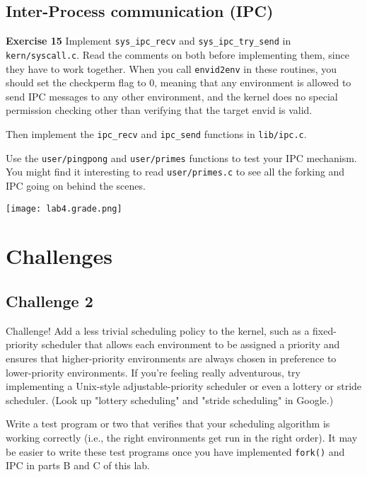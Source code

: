 \documentclass[11pt]{article}
\begin{document}
\subsection{Inter-Process communication (IPC)}

\begin{framed}
\noindent\textbf{Exercise 15} Implement \lstinline|sys_ipc_recv| and \lstinline|sys_ipc_try_send| in \lstinline|kern/syscall.c|. Read the comments on both before implementing them, since they have to work together. When you call \lstinline|envid2env| in these routines, you should set the checkperm flag to 0, meaning that any environment is allowed to send IPC messages to any other environment, and the kernel does no special permission checking other than verifying that the target envid is valid.

Then implement the \lstinline|ipc_recv| and \lstinline|ipc_send| functions in \lstinline|lib/ipc.c|.

Use the \lstinline|user/pingpong| and \lstinline|user/primes| functions to test your IPC mechanism. You might find it interesting to read \lstinline|user/primes.c| to see all the forking and IPC going on behind the scenes.
\end{framed}

\begin{center}
\texttt{[image: lab4.grade.png]}
\end{center}

\section{Challenges}

\subsection{Challenge 2}
\begin{framed}
Challenge! Add a less trivial scheduling policy to the kernel, such as a fixed-priority scheduler that allows each environment to be assigned a priority and ensures that higher-priority environments are always chosen in preference to lower-priority environments. If you're feeling really adventurous, try implementing a Unix-style adjustable-priority scheduler or even a lottery or stride scheduler. (Look up "lottery scheduling" and "stride scheduling" in Google.)

Write a test program or two that verifies that your scheduling algorithm is working correctly (i.e., the right environments get run in the right order). It may be easier to write these test programs once you have implemented \lstinline|fork()| and IPC in parts B and C of this lab.
\end{framed}
\end{document}
